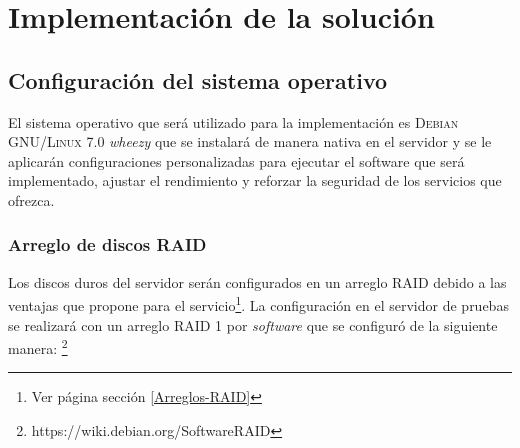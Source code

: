 {
  \linespread{1}
  \cleardoublepage  
  \chapter{Implementaci\'{o}n de la soluci\'{o}n}
  \label{chap:cap3}
}

    \section {Configuraci\'{o}n del sistema operativo}

El sistema operativo que ser\'{a} utilizado para la implementaci\'{o}n es \textsc{Debian GNU/Linux} 7.0 \textit{\guillemotleft wheezy\guillemotright} que se instalar\'{a} de manera nativa en el servidor y se le aplicar\'{a}n configuraciones personalizadas para ejecutar el software que ser\'{a} implementado, ajustar el rendimiento y reforzar la seguridad de los servicios que ofrezca.

      \subsection {Arreglo de discos RAID}

Los discos duros del servidor ser\'{a}n configurados en un arreglo RAID debido a las ventajas que propone para el servicio\footnote{Ver p\'{a}gina \pageref{Arreglos-RAID} secci\'{o}n \ref{Arreglos-RAID}}. La configuraci\'{o}n en el servidor de pruebas se realizar\'{a} con un arreglo RAID 1 por \textit{software} que se configur\'{o} de la siguiente manera: \footnote{https://wiki.debian.org/SoftwareRAID}

